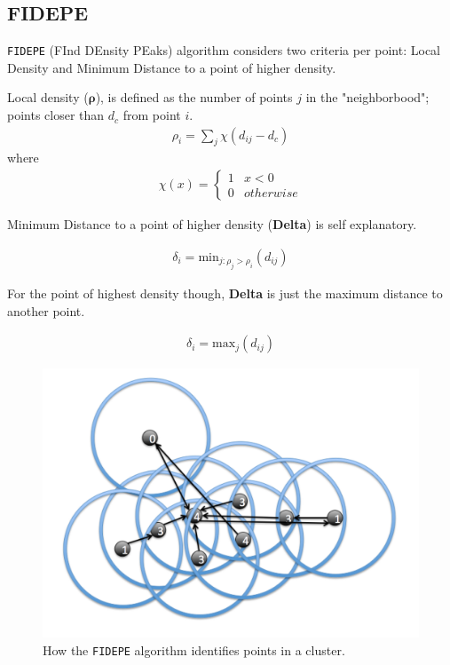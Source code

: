 \documentclass[12pt]{article}
\begin{document}

\subsection{FIDEPE}

\texttt{FIDEPE} (FInd DEnsity PEaks) algorithm \cite{FIDEPE} considers two criteria per point: Local Density and Minimum Distance to a point of higher density.

Local density ($\boldsymbol{\rho}$), is defined as the number of points $j$ in the "neighborbood"; points closer than $d_c$ from point $i$.
\begin{align*}
	\rho_i = \sum_j \chi(d_{ij}-d_c)
\end{align*}
where 
\begin{align*}
\chi(x)=
\begin{cases}
1 & x < 0 \\
0 & otherwise
\end{cases}
\end{align*}

Minimum Distance to a point of higher density (\textbf{Delta}) is self explanatory. 

\begin{align*}
	\delta_i = \text{min}_{j:\rho_j > \rho_i} (d_{ij})
\end{align*}

For the point of highest density though, \textbf{Delta} is just the maximum distance to another point.

\begin{align*}
	\delta_i = \text{max}_{j} (d_{ij})
\end{align*}

\begin{figure}[ht]
\centering
\includegraphics[width=0.8\linewidth]{fidepe_plots/FIDEPE}
\caption{How the \texttt{FIDEPE} algorithm identifies points in a cluster.}
\label{fig:FIDEPE}
\end{figure}
\end{document}
